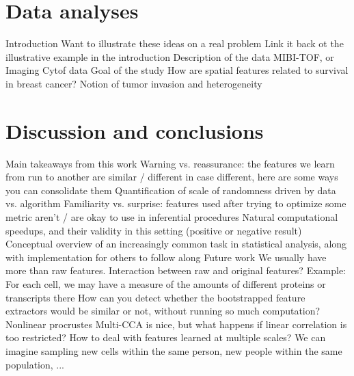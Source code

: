 \documentclass[11pt]{article}
\begin{document}
\section{Data analyses}

\begin{outline}
  \1 Introduction
    \2 Want to illustrate these ideas on a real problem
      \3 Link it back ot the illustrative example in the introduction
    \2 Description of the data
      \3 MIBI-TOF, or Imaging Cytof data
  \1 Goal of the study
    \2 How are spatial features related to survival in breast cancer?
    \2 Notion of tumor invasion and heterogeneity
\end{outline}

\section{Discussion and conclusions}

\begin{outline}
  \1 Main takeaways from this work
    \2 Warning vs. reassurance: the features we learn from run to another are
    similar / different
      \3 in case different, here are some ways you can consolidate them
      \3 Quantification of scale of randomness driven by data vs. algorithm
    \2 Familiarity vs. surprise: features used after trying to optimize some
    metric aren't / are okay to use in inferential procedures
    \2 Natural computational speedups, and their validity in this setting
    (positive or negative result)
    \2 Conceptual overview of an increasingly common task in statistical
    analysis, along with implementation for others to follow along
  \1 Future work
    \2 We usually have more than raw features. Interaction between raw and
    original features?
      \3 Example: For each cell, we may have a measure of the amounts of
      different proteins or transcripts there
    \2 How can you detect whether the bootstrapped feature extractors would be
    similar or not, without running so much computation?
    \2 Nonlinear procrustes
      \3 Multi-CCA is nice, but what happens if linear correlation is too
      restricted?
    \2 How to deal with features learned at multiple scales? We can imagine
    sampling new cells within the same person, new people within the same
    population, ...
\end{outline}



\end{document}
